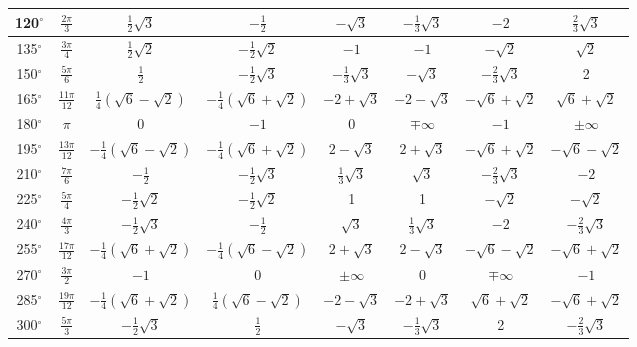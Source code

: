 \begin{table}[htb]
\begin{tabular}{|c|c|c|c|c|c|c|c|}
120$^{\circ}$ & $\frac{2\pi}{3}$ & $\frac{1}{2}\sqrt{3}$ & $-\frac{1}{2}$ & $-\sqrt{3}$ & $-\frac{1}{3}\sqrt{3}$ & $-2$ & $\frac{2}{3}\sqrt{3}$ \\ \hline

135$^{\circ}$ & $\frac{3\pi}{4}$ & $\frac{1}{2}\sqrt{2}$ & $-\frac{1}{2}\sqrt{2}$ & $-1$ & $-1$ & $-\sqrt{2}$ & $\sqrt{2}$ \\ \hline

150$^{\circ}$ & $\frac{5\pi}{6}$ & $\frac{1}{2}$ & $-\frac{1}{2}\sqrt{3}$ & $-\frac{1}{3}\sqrt{3}$ & $-\sqrt{3}$ & $-\frac{2}{3}\sqrt{3}$ & 2 \\ \hline

165$^{\circ}$ & $\frac{11\pi}{12}$ & $\frac{1}{4}\left(\sqrt{6}-\sqrt{2}\right)$ & $-\frac{1}{4}\left(\sqrt{6}+\sqrt{2}\right)$ & $-2+\sqrt{3}$ & $-2-\sqrt{3}$ & $-\sqrt{6}+\sqrt{2}$ & $\sqrt{6}+\sqrt{2}$ \\ \hline

180$^{\circ}$ & $\pi$ & 0 & $-1$ & 0 & $\mp \infty$ & $-1$ & $\pm \infty$ \\ \hline

195$^{\circ}$ & $\frac{13\pi}{12}$ & $-\frac{1}{4}\left(\sqrt{6}-\sqrt{2}\right)$ & $-\frac{1}{4}\left(\sqrt{6}+\sqrt{2}\right)$ & $2-\sqrt{3}$ & $2+\sqrt{3}$ & $-\sqrt{6}+\sqrt{2}$ & $-\sqrt{6}-\sqrt{2}$ \\ \hline

210$^{\circ}$ & $\frac{7\pi}{6}$ & $-\frac{1}{2}$ & $-\frac{1}{2}\sqrt{3}$ & $\frac{1}{3}\sqrt{3}$ & $\sqrt{3}$ & $-\frac{2}{3}\sqrt{3}$ & $-2$ \\ \hline

225$^{\circ}$ & $\frac{5\pi}{4}$ & $-\frac{1}{2}\sqrt{2}$ & $-\frac{1}{2}\sqrt{2}$ & 1 & 1 & $-\sqrt{2}$ & $-\sqrt{2}$ \\ \hline

240$^{\circ}$ & $\frac{4\pi}{3}$ & $-\frac{1}{2}\sqrt{3}$ & $-\frac{1}{2}$ & $\sqrt{3}$ & $\frac{1}{3}\sqrt{3}$ & $-2$ & $-\frac{2}{3}\sqrt{3}$ \\ \hline

255$^{\circ}$ & $\frac{17\pi}{12}$ & $-\frac{1}{4}\left(\sqrt{6}+\sqrt{2}\right)$ & $-\frac{1}{4}\left(\sqrt{6}-\sqrt{2}\right)$ & $2+\sqrt{3}$ & $2-\sqrt{3}$ & $-\sqrt{6}-\sqrt{2}$ & $-\sqrt{6}+\sqrt{2}$ \\ \hline
270$^{\circ}$ & $\frac{3\pi}{2}$ & $-1$ & 0 & $\pm \infty$ & 0 & $\mp \infty$ & $-1$ \\ \hline
285$^{\circ}$ & $\frac{19\pi}{12}$ & $-\frac{1}{4}\left(\sqrt{6}+\sqrt{2}\right)$ & $\frac{1}{4}\left(\sqrt{6}-\sqrt{2}\right)$ & $-2-\sqrt{3}$ & $-2+\sqrt{3}$ & $\sqrt{6}+\sqrt{2}$ & $-\sqrt{6}+\sqrt{2}$ \\ \hline
300$^{\circ}$ & $\frac{5\pi}{3}$ & $-\frac{1}{2}\sqrt{3}$ & $\frac{1}{2}$ & $-\sqrt{3}$ & $-\frac{1}{3}\sqrt{3}$ & 2 & $-\frac{2}{3}\sqrt{3}$ \\ \hline


\end{tabular}
\end{table}
